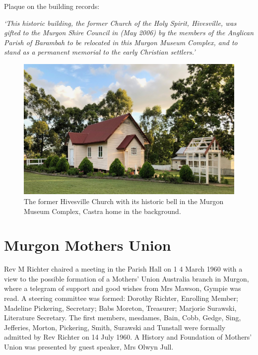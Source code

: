 Plaque on the building records:



\emph{`This historic building, the former Church of the Holy Spirit, Hivesville, was gifted to the Murgon Shire Council in (May 2006) by the members of the Anglican Parish of Barambah to be relocated in this Murgon Museum Complex, and to stand as a permanent memorial to the early Christian settlers.'}









\begin{figure}[!htb]
\begin{center}
\includegraphics[width=1.\textwidth,center]{../images/hivesvilleChurchToday.jpg}
\caption{The former Hivesville Church with its historic bell in the Murgon Museum Complex, Castra home in the background.}
\end{center}
\end{figure}




\section{Murgon Mothers Union}



Rev M Richter chaired a meeting in the Parish Hall on 1 4 March 1960 with a view to the possible formation of a Mothers' Union Australia branch in Murgon, where a telegram of support and good wishes from Mrs Mawson, Gympie was read. A steering committee was formed: Dorothy Richter, Enrolling Member; Madeline Pickering, Secretary; Babs Moreton, Treasurer; Marjorie Surawski, Literature Secretary. The first members, mesdames, Bain, Cobb, Gedge, Sing, Jefferies, Morton, Pickering, Smith, Surawski and Tunstall were formally admitted by Rev Richter on 14 July 1960. A History and Foundation of Mothers' Union was presented by guest speaker, Mrs Olwyn Jull.



